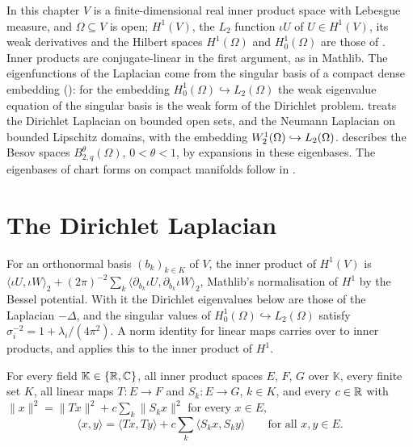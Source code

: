 In this chapter $V$ is a finite-dimensional real inner product space with Lebesgue measure, and
$\Omega \subseteq V$ is open; $H^1(V)$, the $L_2$ function $\iota U$ of $U \in H^1(V)$, its weak
derivatives and the Hilbert spaces $H^1(\Omega)$ and $H^1_0(\Omega)$ are those of
. Inner products are conjugate-linear in the first argument,
as in Mathlib. The eigenfunctions of the Laplacian come from the singular basis of a compact
dense embedding (): for the embedding
$H^1_0(\Omega) \hookrightarrow L_2(\Omega)$ the weak eigenvalue equation of the singular basis is
the weak form of the Dirichlet problem.  treats the Dirichlet
Laplacian on bounded open sets, and  the Neumann Laplacian on
bounded Lipschitz domains, with the embedding $W^{1}_{2}(\Omega) \hookrightarrow L_2(\Omega)$.
 describes the Besov spaces $B^\theta_{2,q}(\Omega)$,
$0 < \theta < 1$, by expansions in these eigenbases. The eigenbases of chart forms on compact
manifolds follow in .

\section{The Dirichlet Laplacian}
\label{sec:dirichlet-eigenbasis}

For an orthonormal basis $(b_k)_{k \in K}$ of $V$, the inner product of $H^1(V)$ is
$\langle \iota U, \iota W \rangle_2 + (2\pi)^{-2} \sum_k \langle \partial_{b_k} \iota U,
\partial_{b_k} \iota W \rangle_2$, Mathlib's normalisation of $H^1$ by the Bessel potential.
With it the Dirichlet eigenvalues below are those of the Laplacian $-\Delta$, and the singular
values of $H^1_0(\Omega) \hookrightarrow L_2(\Omega)$ satisfy
$\sigma_i^{-2} = 1 + \lambda_i/(4\pi^2)$. A norm identity for linear maps carries over to inner
products, and  applies this to the inner product of $H^1$.

\begin{lemma}
\label{lem:polarization-norm-identity}
\leanok
For every field $\mathbb K \in \{\mathbb{R}, \mathbb{C}\}$, all inner product spaces $E$, $F$, $G$ over
$\mathbb K$, every finite set $K$, all linear maps $T : E \to F$ and $S_k : E \to G$, $k \in K$,
and every $c \in \mathbb{R}$ with $\|x\|^2 = \|T x\|^2 + c \sum_k \|S_k x\|^2$ for every $x \in E$,
\[
  \langle x, y \rangle = \langle T x, T y \rangle + c \sum_k \langle S_k x, S_k y \rangle
  \qquad \text{for all } x, y \in E .
\]
\end{lemma}

